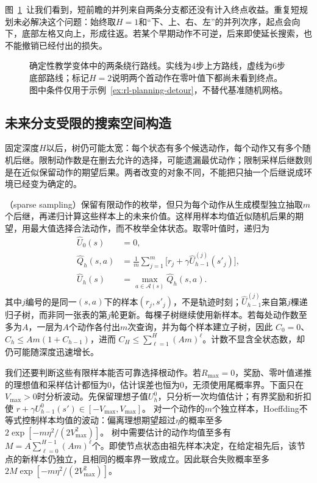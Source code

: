 图~\ref{fig:rl-planning-detour}~让我们看到，短前瞻的并列来自两条分支都还没有计入终点收益。重复短规划未必解决这个问题：始终取$H=1$和“下、上、右、左”的并列次序，起点会向下，底部左格又向上，形成往返。若某个早期动作不可逆，后来即使延长搜索，也不能撤销已经付出的损失。

\begin{figure}[htbp]
 \centering
 
 \caption{确定性教学变体中的两条绕行路线。实线为4步上方路线，虚线为6步底部路线；标记$H=2$说明两个首动作在零叶值下都尚未看到终点。图中条件仅用于示例~\ref{ex:rl-planning-detour}，不替代基准随机网格。}
 \label{fig:rl-planning-detour}
\end{figure}

\subsection{未来分支受限的搜索空间构造}
\label{sec:rl-planning-sparse-search}

固定深度$H$以后，树仍可能太宽：每个状态有多个候选动作，每个动作又有多个随机后继。限制动作数是在删去允许的选择，可能遗漏最优动作；限制采样后继数则是在近似保留动作的期望后果。两者改变的对象不同，不能把只抽一个后继说成环境已经变为确定的。

（sparse sampling）保留有限动作的枚举，但只为每个动作从生成模型独立抽取$m$个后继，再递归计算这些样本上的未来价值。这样用样本均值近似随机后果的期望，用最大值选择合法动作，而不枚举全体状态。取零叶值时，递归为
\begin{equation}
 \begin{aligned}
 \widehat U_0(s)&=0,\\
 \widehat Q_h(s,a)&=\frac1m\sum_{j=1}^{m}
       \bigl[r_j+\gamma\widehat U_{h-1}^{(j)}(s'_j)\bigr],\\
 \widehat U_h(s)&=\max_{a\in\mathcal A(s)}\widehat Q_h(s,a).
 \end{aligned}
 \label{eq:rl-planning-sparse-sampling}
\end{equation}
其中$j$编号的是同一$(s,a)$下的样本$(r_j,s'_j)$，不是轨迹时刻；$\widehat U_{h-1}^{(j)}$来自第$j$棵递归子树，而非同一张表的第$j$轮更新。每棵子树继续使用新样本。若每处动作数至多为$A$，一层为$A$个动作各付出$m$次查询，并为每个样本建立子树，因此
$C_0=0$、$C_h\leq Am(1+C_{h-1})$，进而
$C_H\leq\sum_{\ell=1}^{H}(Am)^\ell$。计数不显含全状态数，却仍可能随深度迅速增长。

我们还要判断这些有限样本能否可靠选择根动作。若$R_{\max}=0$，奖励、零叶值递推的理想值和采样估计都恒为0，估计误差也恒为0，无须使用尾概率界。下面只在$V_{\max}>0$时分析波动。先保留理想子值$U_h^0$，只分析一次均值估计；有界奖励和折扣使
$r+\gamma U_{h-1}^0(s')\in[-V_{\max},V_{\max}]$。
对一个动作的$m$个独立样本，Hoeffding不等式控制样本均值的波动：偏离理想期望超过$\eta$的概率至多
$2\exp[-m\eta^2/(2V_{\max}^2)]$。
树中需要估计的动作均值至多有
$M=A\sum_{\ell=0}^{H-1}(Am)^\ell$个。即使节点状态由祖先样本决定，在给定祖先后，该节点的新样本仍独立，且相同的概率界一致成立。因此联合失败概率至多
$2M\exp[-m\eta^2/(2V_{\max}^2)]$。


